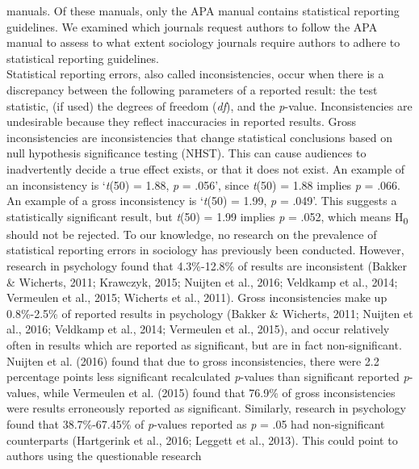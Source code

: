 \documentclass[
  12pt,
]{article}
\begin{document}
manuals. Of these manuals, only the APA manual contains statistical
reporting guidelines. We examined which journals request authors to
follow the APA manual to assess to what extent sociology journals
require authors to adhere to statistical reporting guidelines.\\
\hspace*{0.333em}\hspace*{0.333em}\hspace*{0.333em}\hspace*{0.333em}Statistical
reporting errors, also called inconsistencies, occur when there is a
discrepancy between the following parameters of a reported result: the
test statistic, (if used) the degrees of freedom (\emph{df}), and the
\emph{p}-value. Inconsistencies are undesirable because they reflect
inaccuracies in reported results. Gross inconsistencies are
inconsistencies that change statistical conclusions based on null
hypothesis significance testing (NHST). This can cause audiences to
inadvertently decide a true effect exists, or that it does not exist. An
example of an inconsistency is `\emph{t}(50) = 1.88, \emph{p} = .056',
since \emph{t}(50) = 1.88 implies \emph{p} = .066. An example of a gross
inconsistency is `\emph{t}(50) = 1.99, \emph{p} = .049'. This suggests a
statistically significant result, but \emph{t}(50) = 1.99 implies
\emph{p} = .052, which means H\textsubscript{0} should not be rejected.
To our knowledge, no research on the prevalence of statistical reporting
errors in sociology has previously been conducted. However, research in
psychology found that 4.3\%-12.8\% of results are inconsistent (Bakker
\& Wicherts, 2011; Krawczyk, 2015; Nuijten et al., 2016; Veldkamp et
al., 2014; Vermeulen et al., 2015; Wicherts et al., 2011). Gross
inconsistencies make up 0.8\%-2.5\% of reported results in psychology
(Bakker \& Wicherts, 2011; Nuijten et al., 2016; Veldkamp et al., 2014;
Vermeulen et al., 2015), and occur relatively often in results which are
reported as significant, but are in fact non-significant. Nuijten et al.
(2016) found that due to gross inconsistencies, there were 2.2
percentage points less significant recalculated \emph{p}-values than
significant reported \emph{p}-values, while Vermeulen et al. (2015)
found that 76.9\% of gross inconsistencies were results erroneously
reported as significant. Similarly, research in psychology found that
38.7\%-67.45\% of \emph{p}-values reported as \emph{p} = .05 had
non-significant counterparts (Hartgerink et al., 2016; Leggett et al.,
2013). This could point to authors using the questionable research
\end{document}
